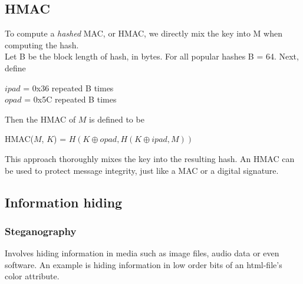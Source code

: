 \documentclass{article}
\begin{document}
\subsection{HMAC}
To compute a \textit{hashed} MAC, or HMAC, we directly mix the key into M when computing the hash.\\
Let B be the block length of hash, in bytes. For all popular hashes B = 64. Next, define
\begin{center}
    $ipad$ = 0x36 repeated B times\\
    $opad$ = 0x5C repeated B times
\end{center}    
Then the HMAC of $M$ is defined to be
\begin{center}
    HMAC($M$, $K$) = $H(K \oplus opad, H(K \oplus ipad, M))$
\end{center}
This approach thoroughly mixes the key into the resulting hash. An HMAC can be used to protect message integrity, just like a MAC or a digital signature.
\newpage
\subsection{Information hiding}
\subsubsection{Steganography}
Involves hiding information in media such as image files, audio data or even software. An example is hiding information in low order bits of an html-file's color attribute.
\end{document}
